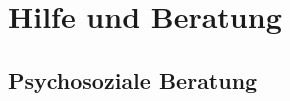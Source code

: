 \documentclass[12pt, a4paper]{article}
\newif\ifinfo
\begin{document}
\ifinfo
	\newpage
	\subsection{Sehenswürdigkeiten}
	
\fi

\newpage
\section{Hilfe und Beratung}
\ifinfo
	\subsection{Don't panic! -- Erste Hilfe: fsi}
	
\else
	
\fi

%	
%	

\ifinfo
	\subsection{Ansprechpartner nach Studiengängen}
	

	\subsection{Prüfungssekretariate}
	

\fi
\subsection{Psychosoziale Beratung}





%
\end{document}
